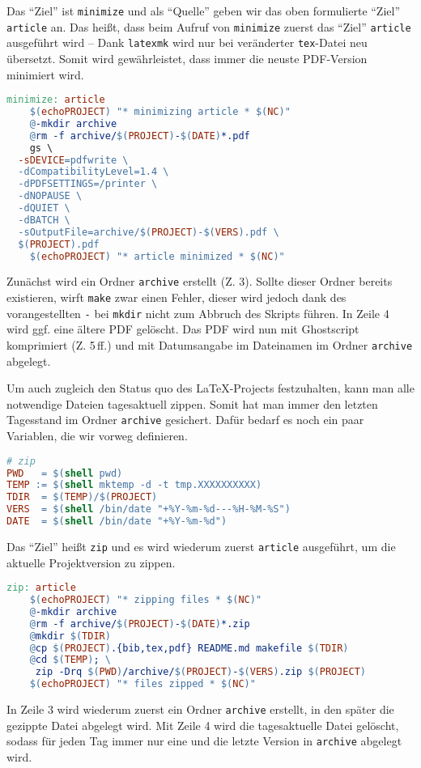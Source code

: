 \documentclass[ngerman]{dtk}
\begin{document}
Das \enquote{Ziel} ist \texttt{minimize} und als \enquote{Quelle}
geben wir das oben formulierte \enquote{Ziel} \texttt{article} an.
Das heißt, dass beim Aufruf von \texttt{minimize} zuerst das
\enquote{Ziel} \texttt{article} ausgeführt wird -- Dank \texttt{latexmk} wird nur
bei veränderter \texttt{tex}-Datei neu übersetzt.
Somit wird gewährleistet, dass  immer die neuste PDF-Version
minimiert wird.
\begin{lstlisting}[style=number,language=make]
minimize: article
	$(echoPROJECT) "* minimizing article * $(NC)"
	@-mkdir archive
	@rm -f archive/$(PROJECT)-$(DATE)*.pdf
	gs \
  -sDEVICE=pdfwrite \
  -dCompatibilityLevel=1.4 \
  -dPDFSETTINGS=/printer \
  -dNOPAUSE \
  -dQUIET \
  -dBATCH \
  -sOutputFile=archive/$(PROJECT)-$(VERS).pdf \
  $(PROJECT).pdf
	$(echoPROJECT) "* article minimized * $(NC)"
\end{lstlisting}
Zunächst wird ein Ordner \texttt{archive} erstellt (Z. 3).
Sollte dieser Ordner bereits existieren,
wirft \texttt{make} zwar einen Fehler,
dieser wird jedoch dank des vorangestellten \texttt{-} bei \texttt{mkdir} nicht zum Abbruch des Skripts führen.
In Zeile 4 wird ggf. eine ältere PDF gelöscht.
Das PDF wird nun mit Ghostscript komprimiert (Z. 5\,ff.)
und mit Datumsangabe im Dateinamen im Ordner \texttt{archive} abgelegt.

Um auch zugleich den Status quo des \LaTeX -Projects festzuhalten,
kann man alle notwendige Dateien tagesaktuell zippen.
Somit hat man immer den letzten Tagesstand im Ordner \texttt{archive} gesichert.
Dafür bedarf es noch ein paar Variablen,
die wir vorweg definieren.
\begin{lstlisting}[style=number,language=make]
# zip
PWD   = $(shell pwd)
TEMP := $(shell mktemp -d -t tmp.XXXXXXXXXX)
TDIR  = $(TEMP)/$(PROJECT)
VERS  = $(shell /bin/date "+%Y-%m-%d---%H-%M-%S")
DATE  = $(shell /bin/date "+%Y-%m-%d")
\end{lstlisting}

Das \enquote{Ziel} heißt \texttt{zip} und es wird wiederum
zuerst \texttt{article} ausgeführt,
um die aktuelle Projektversion zu zippen.
\begin{lstlisting}[style=number,language=make]
zip: article
	$(echoPROJECT) "* zipping files * $(NC)"
	@-mkdir archive
	@rm -f archive/$(PROJECT)-$(DATE)*.zip
	@mkdir $(TDIR)
	@cp $(PROJECT).{bib,tex,pdf} README.md makefile $(TDIR)
	@cd $(TEMP); \
	 zip -Drq $(PWD)/archive/$(PROJECT)-$(VERS).zip $(PROJECT)
	$(echoPROJECT) "* files zipped * $(NC)"
\end{lstlisting}
In Zeile 3 wird wiederum zuerst ein Ordner \texttt{archive} erstellt,
in den später die gezippte Datei abgelegt wird.
Mit Zeile 4 wird die tagesaktuelle Datei gelöscht,
sodass für jeden Tag immer nur eine und die letzte Version in \texttt{archive} abgelegt wird.
\end{document}
